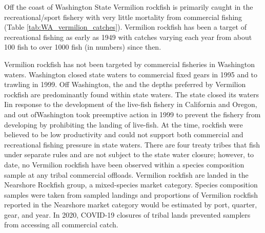 \documentclass[11pt,
  english,
  a4paper,
]{article}
\begin{document}
\leavevmode\tagmcend\tagstructend


Off the coast of Washington State Vermilion rockfish is primarily caught in the recreational/sport fishery with very little mortality from commercial fishing (Table \ref{tab:WA_vermilion_catches}). Vermilion rockfish has been a target of recreational fishing as early as 1949 with catches varying each year from about 100 fish to over 1000 fish (in numbers) since then.

\leavevmode\tagmcend\tagstructend\par


Vermilion rockfish has not been targeted by commercial fisheries in Washington waters. Washington closed state waters to commercial fixed gears in 1995 and to trawling in 1999. Off Washington, the and the depths preferred by Vermilion rockfish are predominantly found within state waters. The state closed its waters Iin response to the development of the live-fish fishery in California and Oregon, and out ofWashington took preemptive action in 1999 to prevent the fishery from developing by prohibiting the landing of live-fish. At the time, rockfish were believed to be low productivity and could not support both commercial and recreational fishing pressure in state waters. There are four treaty tribes that fish under separate rules and are not subject to the state water closure; however, to date, no Vermilion rockfish have been observed within a species composition sample at any tribal commercial offloads. Vermilion rockfish are landed in the Nearshore Rockfish group, a mixed-species market category. Species composition samples were taken from sampled landings and proportions of Vermilion rockfish reported in the Nearshore market category would be estimated by port, quarter, gear, and year. In 2020, COVID-19 closures of tribal lands prevented samplers from accessing all commercial catch.

\leavevmode\tagmcend\tagstructend\par

\end{document}
